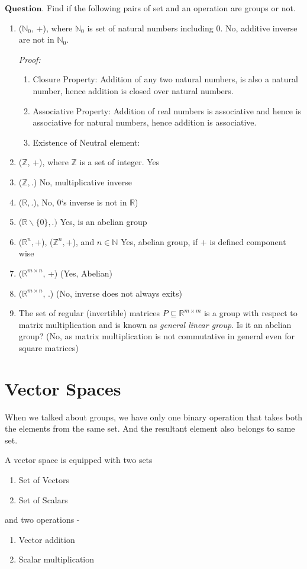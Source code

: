 \documentclass{article}
\begin{document}
$\boldsymbol{Question}$. Find if the following pairs of set and an operation are groups or not.
\begin{enumerate}
    \item ($\mathbb{N}_0$, +), where $\mathbb{N}_0$ is set of natural numbers including 0. No, additive inverse are not in $\mathbb{N}_0$.\par
    \textit{Proof: } 
        \begin{enumerate}
            \item Closure Property: Addition of any two natural numbers, is also a natural number, hence addition is closed over natural numbers.
            \item Associative Property: Addition of real numbers is associative and hence is associative for natural numbers, hence addition is associative.
            \item Existence of Neutral element: 
        \end{enumerate}
    \item ($\mathbb{Z}$, +), where $\mathbb{Z}$ is a set of integer. Yes
    
    \item ($\mathbb{Z}, .$) No, multiplicative inverse
    \item ($\mathbb{R}, .$), No, 0`s inverse is not in $\mathbb{R}$)
    \item ($\mathbb{R} \backslash \{0\}, .)$ Yes, is an abelian group
    \item ($\mathbb{R}^n, +$), ($\mathbb{Z}^n, +$), and $n \in \mathbb{N}$ Yes, abelian group, if $+$ is defined component wise
    \item ($\mathbb{R}^{m\times n}$, +) (Yes, Abelian)
    \item ($\mathbb{R}^{m\times n}$, .) (No, inverse does not always exits)
    \item The set of regular (invertible) matrices  $P\subseteq \mathbb{R}^{m\times m}$ is a group with respect to matrix multiplication and is known as \textit{general linear group}. Is it an abelian group? (No, as matrix multiplication is not commutative in general even for square matrices)
\end{enumerate}


\section{Vector Spaces}

When we talked about groups, we have only one binary operation that takes both the elements from the same set. And the resultant element also belongs to same set.\par
A vector space is equipped with two sets 
\begin{enumerate}
    \item Set of Vectors
    \item Set of Scalars
\end{enumerate}
and two operations -
\begin{enumerate}
    \item Vector addition 
    \item Scalar multiplication 
\end{enumerate}
\end{document}
